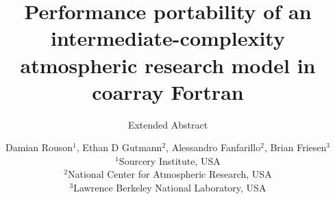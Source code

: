 \documentclass[sigconf]{acmart}
\begin{document}

\title[Performance portability of coarray-ICAR]{Performance portability of an intermediate-complexity atmospheric research model in coarray Fortran}
\subtitle{Extended Abstract}

\author{
Damian Rouson$^1$, Ethan D Gutmann$^2$, Alessandro Fanfarillo$^2$, Brian Friesen$^3$\vspace{5pt}\\
\normalsize
{$^1$Sourcery Institute, USA}\vspace{1pt}\\
{$^2$National Center for Atmospheric Research, USA}\vspace{1pt}\\
{$^3$Lawrence Berkeley National Laboratory, USA}\vspace{1pt}\\
}
\renewcommand{\shortauthors}{Damian Rouson et al.}

%
%

\end{document}
